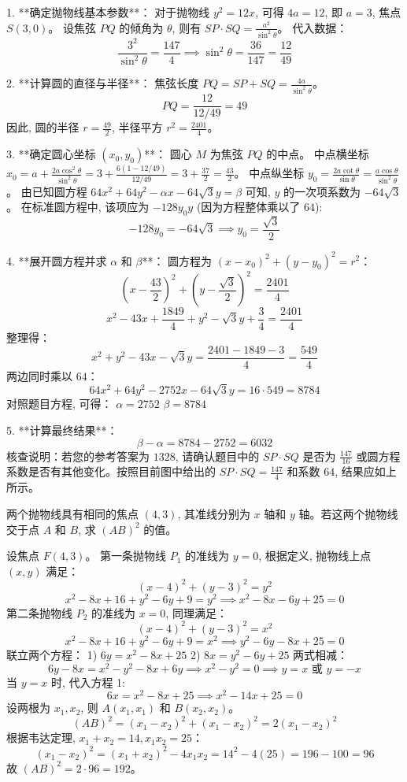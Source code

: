 \begin{questions}
\begin{solution}
1. **确定抛物线基本参数**：
对于抛物线 $y^2 = 12x$, 可得 $4a = 12$, 即 $a = 3$, 焦点 $S(3, 0)$。
设焦弦 $PQ$ 的倾角为 $\theta$, 则有 $SP \cdot SQ = \frac{a^2}{\sin^2\theta}$。
代入数据：
\[
\frac{3^2}{\sin^2\theta} = \frac{147}{4} \implies \sin^2\theta = \frac{36}{147} = \frac{12}{49}
\]

2. **计算圆的直径与半径**：
焦弦长度 $PQ = SP + SQ = \frac{4a}{\sin^2\theta}$。
\[
PQ = \frac{12}{12/49} = 49
\]
因此, 圆的半径 $r = \frac{49}{2}$, 半径平方 $r^2 = \frac{2401}{4}$。

3. **确定圆心坐标 $(x_0, y_0)$**：
圆心 $M$ 为焦弦 $PQ$ 的中点。
中点横坐标 $x_0 = a + \frac{2a\cos^2\theta}{\sin^2\theta} = 3 + \frac{6(1 - 12/49)}{12/49} = 3 + \frac{37}{2} = \frac{43}{2}$。
中点纵坐标 $y_0 = \frac{2a\cot\theta}{\sin\theta} = \frac{a\cos\theta}{\sin^2\theta}$。
由已知圆方程 $64x^2 + 64y^2 - \alpha x - 64\sqrt{3}y = \beta$ 可知, $y$ 的一次项系数为 $-64\sqrt{3}$。
在标准圆方程中, 该项应为 $-128y_0 y$ (因为方程整体乘以了 $64$):
\[
-128y_0 = -64\sqrt{3} \implies y_0 = \frac{\sqrt{3}}{2}
\]

4. **展开圆方程并求 $\alpha$ 和 $\beta$**：
圆方程为 $(x - x_0)^2 + (y - y_0)^2 = r^2$：
\[
\left( x - \frac{43}{2} \right)^2 + \left( y - \frac{\sqrt{3}}{2} \right)^2 = \frac{2401}{4}
\]
\[
x^2 - 43x + \frac{1849}{4} + y^2 - \sqrt{3}y + \frac{3}{4} = \frac{2401}{4}
\]
整理得：
\[
x^2 + y^2 - 43x - \sqrt{3}y = \frac{2401 - 1849 - 3}{4} = \frac{549}{4}
\]
两边同时乘以 $64$：
\[
64x^2 + 64y^2 - 2752x - 64\sqrt{3}y = 16 \cdot 549 = 8784
\]
对照题目方程, 可得：
$\alpha = 2752$
$\beta = 8784$

5. **计算最终结果**：
\[
\beta - \alpha = 8784 - 2752 = 6032
\]
核查说明：若您的参考答案为 $1328$, 请确认题目中的 $SP \cdot SQ$ 是否为 $\frac{147}{16}$ 或圆方程系数是否有其他变化。按照目前图中给出的 $SP \cdot SQ = \frac{147}{4}$ 和系数 $64$, 结果应如上所示。
\end{solution}

    \question
两个抛物线具有相同的焦点 $(4, 3)$, 其准线分别为 $x$ 轴和 $y$ 轴。若这两个抛物线交于点 $A$ 和 $B$, 求 $(AB)^2$ 的值。

\begin{solution}

设焦点 $F(4, 3)$。
第一条抛物线 $P_1$ 的准线为 $y = 0$, 根据定义, 抛物线上点 $(x, y)$ 满足：
\[
(x - 4)^2 + (y - 3)^2 = y^2
\]
\[
x^2 - 8x + 16 + y^2 - 6y + 9 = y^2 \implies x^2 - 8x - 6y + 25 = 0
\]
第二条抛物线 $P_2$ 的准线为 $x = 0$, 同理满足：
\[
(x - 4)^2 + (y - 3)^2 = x^2
\]
\[
x^2 - 8x + 16 + y^2 - 6y + 9 = x^2 \implies y^2 - 6y - 8x + 25 = 0
\]
联立两个方程：
1) $6y = x^2 - 8x + 25$
2) $8x = y^2 - 6y + 25$
两式相减：
\[
6y - 8x = x^2 - y^2 - 8x + 6y \implies x^2 - y^2 = 0 \implies y = x \text{ 或 } y = -x
\]
当 $y = x$ 时, 代入方程 1:
\[
6x = x^2 - 8x + 25 \implies x^2 - 14x + 25 = 0
\]
设两根为 $x_1, x_2$, 则 $A(x_1, x_1)$ 和 $B(x_2, x_2)$。
\[
(AB)^2 = (x_1 - x_2)^2 + (x_1 - x_2)^2 = 2(x_1 - x_2)^2
\]
根据韦达定理, $x_1 + x_2 = 14, x_1x_2 = 25$：
\[
(x_1 - x_2)^2 = (x_1 + x_2)^2 - 4x_1x_2 = 14^2 - 4(25) = 196 - 100 = 96
\]
故 $(AB)^2 = 2 \cdot 96 = 192$。
\end{solution}


\end{questions}
